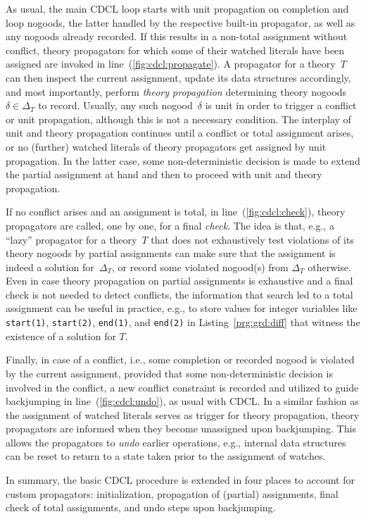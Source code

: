 As usual,
the main CDCL loop starts with unit propagation on completion and loop nogoods,
the latter handled by the respective built-in propagator, as well as any nogoods
already recorded.
If this results in a non-total assignment without conflict,
theory propagators for which some of their watched literals have been assigned
are invoked in line~(\ref{fig:cdcl:propagate}).
A propagator for a theory~$T$ can then inspect the current assignment,
update its data structures accordingly, and most importantly,
perform \emph{theory propagation} determining theory nogoods $\delta\in\Delta_T$ to record.
Usually, any such nogood~$\delta$ is unit in order to trigger a conflict or unit propagation,
although this is not a necessary condition.
The interplay of unit and theory propagation continues until a conflict or
total assignment arises,
or no (further) watched literals of theory propagators get assigned by unit propagation.
In the latter case, some non-deterministic decision is made to extend the partial
assignment at hand and then to proceed with unit and theory propagation.

If no conflict arises and an assignment is total,
in line~(\ref{fig:cdcl:check}), theory propagators are called, one by one,
for a final \emph{check}.
The idea is that, e.g., a ``lazy'' propagator for a theory~$T$
that does not exhaustively test violations of its theory nogoods by partial assignments
can make sure that the assignment is indeed a solution for~$\Delta_T$, or record some
violated nogood(s) from $\Delta_T$ otherwise.
Even in case theory propagation on partial assignments is exhaustive and a final
check is not needed to detect conflicts,
the information that search led to a total assignment can be useful in practice, e.g.,
to store values for integer variables like
\lstinline{start(1)},
\lstinline{start(2)},
\lstinline{end(1)}, and
\lstinline{end(2)} in Listing~\ref{prg:grd:diff}
that witness the existence of a solution for $T$.

Finally, in case of a conflict, i.e., some completion or recorded nogood is violated by
the current assignment,
provided that some non-deterministic decision is involved in the conflict,
a new conflict constraint is recorded and utilized to guide backjumping
in line~(\ref{fig:cdcl:undo}), as usual with CDCL.
In a similar fashion as the assignment of watched literals serves as
trigger for theory propagation, theory propagators are informed when they become
unassigned upon backjumping.
This allows the propagators to \emph{undo} earlier operations, e.g., internal data structures can be
reset to return   to a state taken prior to the assignment of watches.

In summary, the basic CDCL procedure is extended in four places to account for
custom propagators: initialization, propagation of (partial) assignments,
final check of total assignments, and undo steps upon backjumping.

